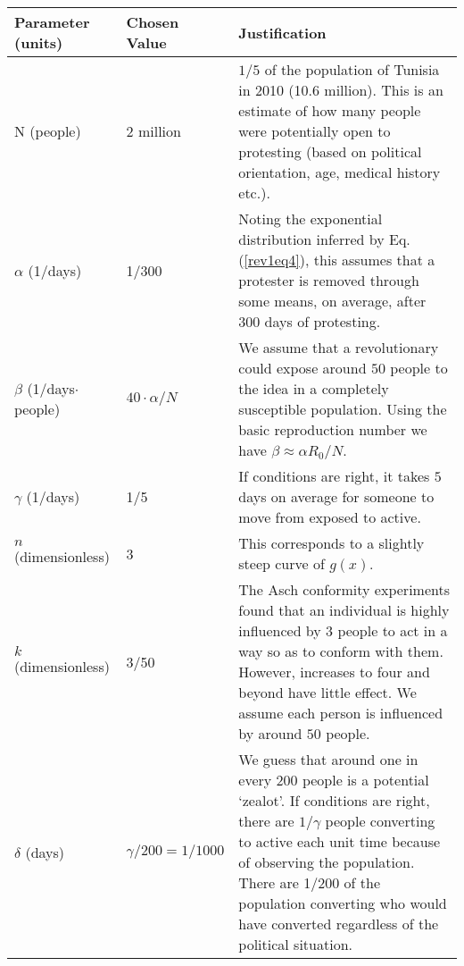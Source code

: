 \begin{table}
	 \label{tab:parameters1} 
	\centering
	\begin{tabular}{| l | l | p{7.5cm} |}
		\hline
		Parameter (units) & Chosen Value & Justification \\ \hline
		N (people) & 2 million & $1/5$ of the population of Tunisia in 2010 (10.6 million). This is an estimate of how many people were potentially open to protesting (based on political orientation, age, medical history etc.).\\ \hline
		$\alpha$ (1/days) & 1/300 & Noting the exponential distribution inferred by Eq. (\ref{rev1eq4}), this assumes that a protester is removed through some means, on average, after 300 days of protesting. \\ \hline
		$\beta$ (1/days$\cdot$people) & $40\cdot \alpha/N$ & We assume that a revolutionary could expose around $50$ people to the idea in a completely susceptible population. Using the basic reproduction number we have $\beta\approx\alpha R_0/N$. \\ \hline
		$\gamma$ (1/days) & 1/5 & If conditions are right, it takes $5$ days on average for someone to move from exposed to active. \\ \hline
		$n$ (dimensionless) & 3 & This corresponds to a slightly steep curve of $g(x)$. \\ \hline
		$k$ (dimensionless) & 3/50 & The Asch conformity experiments found that an individual is highly influenced by 3 people to act in a way so as to conform with them\cite{asch-conformity}. However, increases to four and beyond have little effect. We assume each person is influenced by around $50$ people. \\ \hline
		$\delta$ (days) & $\gamma/200=1/1000$ & 
		We guess that around one in every 200 people is a potential `zealot'. If conditions are right, there are $1/\gamma$ people converting to active each unit time because of observing the population. There are 1/200 of the population converting who would have converted regardless of the political situation. \\ \hline
	\end{tabular}
\label{tab:parameters-compartments-1}
\end{table}

